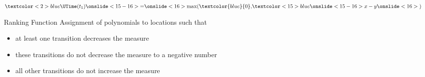 \begin{overprint}
  \centering
  $\textcolor<2>{blue}{\UTime(t_1)} \onslide<15-16>{=} \onslide<16>{\max(\textcolor{blue}{0},}\textcolor<15>{blue}{\onslide<15-16>{x-y}}\onslide<16>{)}$

  \begin{block}{Ranking Function}
    Assignment of polynomials to locations such that
    \begin{itemize}
    \item<18-> at least one transition decreases the measure
    \item<19-> these transitions do not decrease the measure to a negative number
    \item<20-> all other transitions do not increase the measure
    \end{itemize}
  \end{block}
\end{overprint}
